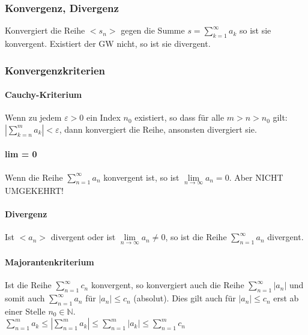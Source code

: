 \subsubsection{Konvergenz, Divergenz}
Konvergiert die Reihe $< s_n >$ gegen die Summe $ s = \sum\limits_{k=1}^{\infty} a_k $ so ist sie konvergent. 
Existiert der GW nicht, so ist sie divergent.

\subsubsection{Konvergenzkriterien}

\paragraph{Cauchy-Kriterium} 
Wenn zu jedem $\varepsilon > 0$ ein Index $n_0$ existiert, so dass für alle $m > n > n_0$ gilt: \\
$\left| \sum\limits_{k=n}^m a_k \right| < \varepsilon$, dann konvergiert die Reihe, ansonsten divergiert sie.

\paragraph{lim = 0}
Wenn die Reihe $ \sum\limits_{n=1}^{\infty} a_n $ konvergent ist, so ist $\lim\limits_{n \to \infty} a_n = 0$. \hspace{2cm} Aber NICHT UMGEKEHRT!

\paragraph{Divergenz}
Ist $<a_n>$ divergent oder ist $\lim\limits_{n \to \infty} a_n \neq 0$, so ist die Reihe $ \sum\limits_{n=1}^{\infty} a_n $ divergent.

\paragraph{Majorantenkriterium}
Ist die Reihe $ \sum\limits_{n=1}^{\infty} c_n $ konvergent, so konvergiert auch die Reihe $ \sum\limits_{n=1}^{\infty} |a_n|$ und somit auch
$\sum\limits_{n=1}^{\infty} a_n$ für $|a_n| \leq c_n$ (absolut).
Dies gilt auch für $|a_n| \leq c_n$ erst ab einer Stelle $n_0 \in \mathbb{N}$.\\
$\sum\limits_{n=1}^{m}a_k \leq |\sum\limits_{n=1}^{m}a_k| \leq \sum\limits_{n=1}^{m}|a_k| \leq \sum\limits_{n=1}^{m}c_n$

